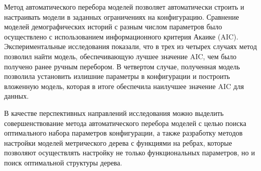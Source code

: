 Метод автоматического перебора моделей позволяет автоматически строить и настраивать модели в заданных ограничениях на конфигурацию.
Сравнение моделей демографических историй с разным числом параметров было осуществлено с использованием информационного критерия Акаике (AIC).
Экспериментальные исследования показали, что в трех из четырех случаях метод позволил найти модель, обеспечивающую лучшее значение AIC, чем было получено ранее ручным перебором.
В четвертом случае, полученная модель позволила установить излишние параметры в конфигурации и построить вложенную модель, которая в итоге обеспечила наилучшее значение AIC для данных.

В качестве перспективных направлений исследования можно выделить совершенствование метода автоматического перебора моделей с целью поиска оптимального набора параметров конфигурации, а также разработку методов настройки моделей метрического дерева с функциями на ребрах, которые позволяют осуществлять настройку не только функциональных параметров, но и поиск оптимальной структуры дерева.